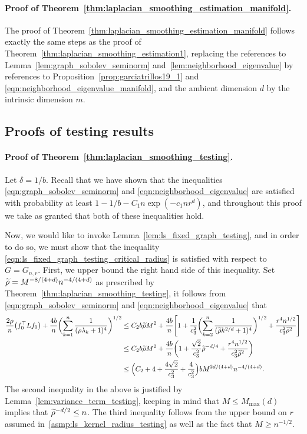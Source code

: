 \paragraph{Proof of Theorem~\ref{thm:laplacian_smoothing_estimation_manifold}.}
The proof of Theorem~\ref{thm:laplacian_smoothing_estimation_manifold} follows exactly the same steps as the proof of Theorem~\ref{thm:laplacian_smoothing_estimation1}, replacing the references to Lemma~\ref{lem:graph_sobolev_seminorm} and~\ref{lem:neighborhood_eigenvalue} by references to Proposition~\ref{prop:garciatrillos19_1} and \eqref{eqn:neighborhood_eigenvalue_manifold}, and the ambient dimension $d$ by the intrinsic dimension $m$. 

\subsection{Proofs of testing results}
\label{subsec:laplacian_smoothing_testing_pf}

\paragraph{Proof of Theorem~\ref{thm:laplacian_smoothing_testing}.}
Let $\delta = 1/b$. Recall that we have shown that the inequalities \eqref{eqn:graph_sobolev_seminorm} and \eqref{eqn:neighborhood_eigenvalue} are satisfied with probability at least $1 - 1/b - C_1n\exp(-c_1nr^d)$, and throughout this proof we take as granted that both of these inequalities hold. 

Now, we would like to invoke Lemma~\ref{lem:ls_fixed_graph_testing}, and in order to do so, we must show that the inequality \eqref{eqn:ls_fixed_graph_testing_critical_radius} is satisfied with respect to $G = G_{n,r}$. First, we upper bound the right hand side of this inequality. Set $\widetilde{\rho} = M^{-8/(4 + d)}n^{-4/(4 + d)}$ as prescribed by Theorem~\ref{thm:laplacian_smoothing_testing}, it follows from \eqref{eqn:graph_sobolev_seminorm} and \eqref{eqn:neighborhood_eigenvalue} that
\begin{align*}
\frac{2 \rho}{n} \bigl(f_0^{\top} L f_0\bigr) + \frac{4b}{n} \biggl(\sum_{k = 1}^{n} \frac{1}{(\rho\lambda_k + 1)^4} \biggr)^{1/2} & \leq C_2b\widetilde{\rho}M^2 + \frac{4b}{n}\Biggl[1 + \frac{1}{c_3^2}\biggl(\sum_{k = 2}^{n} \frac{1}{(\widetilde{\rho}k^{2/d} + 1)^4} \biggr)^{1/2} + \frac{r^4n^{1/2}}{c_3^2\widetilde{\rho}^2}\Biggr] \\
& \leq C_2b\widetilde{\rho}M^2 + \frac{4b}{n}\biggl(1 + \frac{\sqrt{2}}{c_3^{2}}\widetilde{\rho}^{-d/4} + \frac{r^4n^{1/2}}{c_3^2\widetilde{\rho}^2}\biggr) \\ 
& \leq \Bigl(C_2 + 4 + \frac{4\sqrt{2}}{c_3^{2}} + \frac{4}{c_3^2}\Bigr)bM^{2d/(4 + d)} n^{-4/(4 + d)}.
\end{align*}
The second inequality in the above is justified by Lemma~\ref{lem:variance_term_testing}, keeping in mind that $M \leq M_{\max}(d)$ implies that $\widetilde{\rho}^{-d/2} \leq n$. The third inequality follows from the upper bound on $r$ assumed in~\ref{asmp:ls_kernel_radius_testing} as well as the fact that $M \geq n^{-1/2}$.


